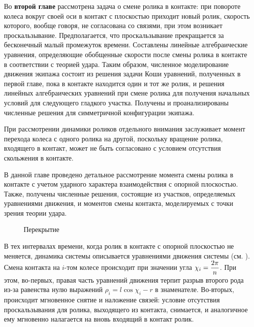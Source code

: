 
Во \textbf{второй главе} рассмотрена задача о смене ролика в контакте: при повороте колеса вокруг своей оси в контакт с плоскостью приходит новый ролик, скорость которого, вообще говоря, не согласована со связями, при этом возникает проскальзывание. Предполагается, что проскальзывание прекращается за бесконечный малый промежуток времени. Составлены линейные алгебраические уравнения, определяющие обобщенные скорости после смены ролика в контакте в соответствии с теорией удара. Таким образом, численное моделирование движения экипажа состоит из решения задачи Коши уравнений, полученных в первой главе, пока в контакте находится один и тот же ролик, и решения линейных алгебраических уравнений при смене ролика для получения начальных условий для следующего гладкого участка. Получены и проанализированы численные решения для симметричной конфигурации экипажа.

При рассмотрении динамики роликов отдельного внимания заслуживает момент перехода колеса с одного ролика на другой, поскольку вращение ролика, входящего в контакт, может не быть согласовано с условием отсутствия скольжения в контакте.

В данной главе проведено детальное рассмотрение момента смены ролика в контакте с учетом ударного характера взаимодействия с опорной плоскостью. Также, получены численные решения, состоящие из участков, определяемых уравнениями движения, и моментов смены контакта, моделируемых с точки зрения теории удара.

\begin{figure}
    \minipage{\textwidth}
        \centering
        \caption{Перекрытие}
        \label{fig:overlap}
    \endminipage
\end{figure}

В тех интервалах времени, когда ролик в контакте с опорной плоскостью не меняется, динамика системы описывается уравнениями движения системы (см. \cite{GerasimovZobovaPMM2018}). Смена контакта на $i$-том колесе происходит при значении угла $\chi_i = \displaystyle\frac{\displaystyle 2\pi}{\displaystyle n}$. При этом, во-первых, правая часть уравнений движения терпит разрыв второго рода из-за равенства нулю выражений $\rho_i = l\cos\chi_i-r$ в знаменателе. Во-вторых, происходит мгновенное снятие и наложение связей: условие отсутствия проскальзывания для ролика, выходящего из контакта, снимается, и аналогичное ему мгновенно налагается на вновь входящий в контакт ролик.

